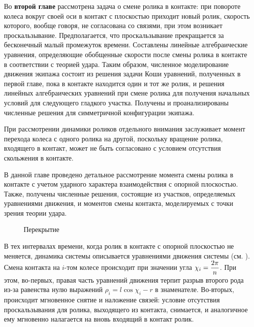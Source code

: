 
Во \textbf{второй главе} рассмотрена задача о смене ролика в контакте: при повороте колеса вокруг своей оси в контакт с плоскостью приходит новый ролик, скорость которого, вообще говоря, не согласована со связями, при этом возникает проскальзывание. Предполагается, что проскальзывание прекращается за бесконечный малый промежуток времени. Составлены линейные алгебраические уравнения, определяющие обобщенные скорости после смены ролика в контакте в соответствии с теорией удара. Таким образом, численное моделирование движения экипажа состоит из решения задачи Коши уравнений, полученных в первой главе, пока в контакте находится один и тот же ролик, и решения линейных алгебраических уравнений при смене ролика для получения начальных условий для следующего гладкого участка. Получены и проанализированы численные решения для симметричной конфигурации экипажа.

При рассмотрении динамики роликов отдельного внимания заслуживает момент перехода колеса с одного ролика на другой, поскольку вращение ролика, входящего в контакт, может не быть согласовано с условием отсутствия скольжения в контакте.

В данной главе проведено детальное рассмотрение момента смены ролика в контакте с учетом ударного характера взаимодействия с опорной плоскостью. Также, получены численные решения, состоящие из участков, определяемых уравнениями движения, и моментов смены контакта, моделируемых с точки зрения теории удара.

\begin{figure}
    \minipage{\textwidth}
        \centering
        \caption{Перекрытие}
        \label{fig:overlap}
    \endminipage
\end{figure}

В тех интервалах времени, когда ролик в контакте с опорной плоскостью не меняется, динамика системы описывается уравнениями движения системы (см. \cite{GerasimovZobovaPMM2018}). Смена контакта на $i$-том колесе происходит при значении угла $\chi_i = \displaystyle\frac{\displaystyle 2\pi}{\displaystyle n}$. При этом, во-первых, правая часть уравнений движения терпит разрыв второго рода из-за равенства нулю выражений $\rho_i = l\cos\chi_i-r$ в знаменателе. Во-вторых, происходит мгновенное снятие и наложение связей: условие отсутствия проскальзывания для ролика, выходящего из контакта, снимается, и аналогичное ему мгновенно налагается на вновь входящий в контакт ролик.

